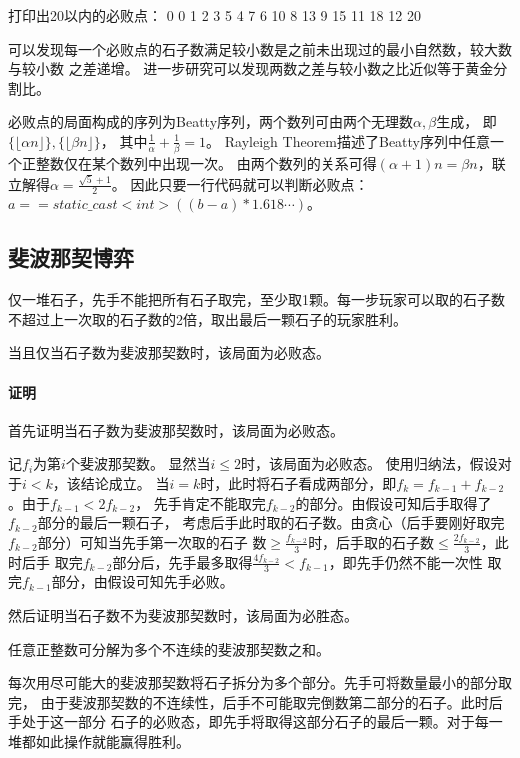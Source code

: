 打印出20以内的必败点：
0 0
1 2
3 5
4 7
6 10
8 13
9 15
11 18
12 20

可以发现每一个必败点的石子数满足较小数是之前未出现过的最小自然数，较大数与较小数
之差递增。
进一步研究可以发现两数之差与较小数之比近似等于黄金分割比。

必败点的局面构成的序列为Beatty序列，两个数列可由两个无理数$\alpha,\beta$生成，
即$\{\lfloor\alpha n\rfloor\},\{\lfloor\beta n\rfloor\}$，
其中$\frac{1}{\alpha}+\frac{1}{\beta}=1$。
Rayleigh Theorem描述了Beatty序列中任意一个正整数仅在某个数列中出现一次。
由两个数列的关系可得$(\alpha+1)n=\beta n$，联立解得$\alpha=\frac{\sqrt{5}+1}{2}$。
因此只要一行代码就可以判断必败点：$a==static\_cast<int>((b-a)*1.618\cdots)$。

\subsection{斐波那契博弈}
仅一堆石子，先手不能把所有石子取完，至少取1颗。每一步玩家可以取的石子数
不超过上一次取的石子数的2倍，取出最后一颗石子的玩家胜利。

\begin{theorem}
	当且仅当石子数为斐波那契数时，该局面为必败态。
\end{theorem}

\paragraph{证明}
首先证明当石子数为斐波那契数时，该局面为必败态。

记$f_i$为第$i$个斐波那契数。
显然当$i\leq 2$时，该局面为必败态。
使用归纳法，假设对于$i<k$，该结论成立。
当$i=k$时，此时将石子看成两部分，即$f_k=f_{k-1}+f_{k-2}$。由于$f_{k-1}<2f_{k-2}$，
先手肯定不能取完$f_{k-2}$的部分。由假设可知后手取得了$f_{k-2}$部分的最后一颗石子，
考虑后手此时取的石子数。由贪心（后手要刚好取完$f_{k-2}$部分）可知当先手第一次取的石子
数$\geq \frac{f_{k-2}}{3}$时，后手取的石子数$\leq \frac{2f_{k-2}}{3}$，此时后手
取完$f_{k-2}$部分后，先手最多取得$\frac{4f_{k-2}}{3}<f_{k-1}$，即先手仍然不能一次性
取完$f_{k-1}$部分，由假设可知先手必败。

然后证明当石子数不为斐波那契数时，该局面为必胜态。
\begin{lemma}
	任意正整数可分解为多个不连续的斐波那契数之和。
\end{lemma}
每次用尽可能大的斐波那契数将石子拆分为多个部分。先手可将数量最小的部分取完，
由于斐波那契数的不连续性，后手不可能取完倒数第二部分的石子。此时后手处于这一部分
石子的必败态，即先手将取得这部分石子的最后一颗。对于每一堆都如此操作就能赢得胜利。

